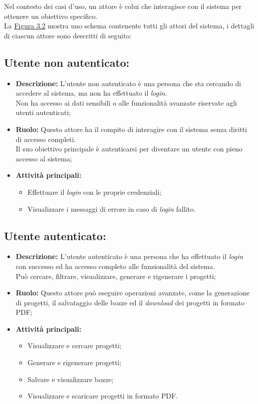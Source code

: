 Nel contesto dei casi d'uso, un attore è colui che interagisce con il sistema per ottenere un obiettivo specifico.\\
La {\hyperref[fig:attori-casi-duso]{Figura 3.2}} mostra uno schema contenente tutti gli attori del sistema, i dettagli di ciascun attore sono descritti di seguito:

\subsection*{Utente non autenticato:}

\begin{itemize}
    \item \textbf{Descrizione:}  L'utente non autenticato è una persona che sta cercando di accedere al sistema, ma non ha effettuato il \textit{login}.\\
    Non ha accesso ai dati sensibili o alle funzionalità avanzate riservate agli utenti autenticati;
    \item \textbf{Ruolo:} Questo attore ha il compito di interagire con il sistema senza diritti di accesso completi.\\
    Il suo obiettivo principale è autenticarsi per diventare un utente con pieno accesso al sistema;
    \item \textbf{Attività principali:}
        \begin{itemize}
            \item Effettuare il \textit{login} con le proprie credenziali;
            \item Visualizzare i messaggi di errore in caso di \textit{login} fallito.
        \end{itemize}
\end{itemize}

\subsection*{Utente autenticato:}

\begin{itemize}
    \item \textbf{Descrizione:}  L'utente autenticato è una persona che ha effettuato il \textit{login} con successo ed ha accesso completo alle funzionalità del sistema.\\
    Può cercare, filtrare, visualizzare, generare e rigenerare i progetti;
    \item \textbf{Ruolo:} Questo attore può eseguire operazioni avanzate, come la generazione di progetti, il salvataggio delle bozze ed il \textit{download} dei progetti in formato PDF;
    \item \textbf{Attività principali:}
        \begin{itemize}
            \item Visualizzare e cercare progetti;
            \item Generare e rigenerare progetti;
            \item Salvare e visualizzare bozze;
            \item Visualizzare e scaricare progetti in formato PDF.
        \end{itemize}
\end{itemize}

